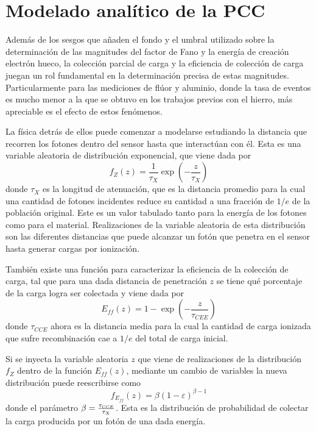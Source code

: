 \chapter{Modelado analítico de la PCC \label{chap:ModeloPCC}}
\noindent Además de los sesgos que añaden el fondo y el umbral utilizado sobre la determinación de las magnitudes del factor de Fano y la energía de creación electrón hueco, la colección parcial de carga y la eficiencia de colección de carga juegan un rol fundamental en la determinación precisa de estas magnitudes. Particularmente para las mediciones de flúor y aluminio, donde la tasa de eventos es mucho menor a la que se obtuvo en los trabajos previos\cite{TesisAndi,TesisKevin,Rodrigues} con el hierro, más apreciable es el efecto de estos fenómenos.

La física detrás de ellos puede comenzar a modelarse estudiando la distancia que recorren los fotones dentro del sensor hasta que interactúan con él. Esta es una variable aleatoria de distribución exponencial, que viene dada por
\begin{equation*}
    f_{Z}(z) = \frac{1}{\tau_{X}}\exp(-\frac{z}{\tau_{X}})
\end{equation*}
donde $\tau_{X}$ es la longitud de atenuación, que es la distancia promedio para la cual una cantidad de fotones incidentes reduce su cantidad a una fracción de $1/e$ de la población original. Este es un valor tabulado tanto para la energía de los fotones como para el material. Realizaciones de la variable aleatoria de esta distribución son las diferentes distancias que puede alcanzar un fotón que penetra en el sensor hasta generar cargas por ionización.

También existe una función para caracterizar la eficiencia de la colección de carga, tal que para una dada distancia de penetración $z$ se tiene qué porcentaje de la carga logra ser colectada y viene dada por
\begin{equation*}
    E_{ff}(z) = 1 - 
    \exp
    \left(
        -\frac{z}{\tau_{CEE}}
    \right)
\end{equation*}
donde $\tau_{CCE}$ ahora es la distancia media para la cual la cantidad de carga ionizada que sufre recombinación cae a $1/e$ del total de carga inicial.

Si se inyecta la variable aleatoria $z$ que viene de realizaciones de la distribución $f_{Z}$ dentro de la función $E_{ff}(z)$, mediante un cambio de variables la nueva distribución puede reescribirse como
\begin{equation*}
    f_{E_{ff}}(z) = \beta (1 - \varepsilon)^{\beta - 1}
\end{equation*}
donde el parámetro $\beta = \frac{\tau_{\scaleto{CCE}{3pt}}}{\tau_{X}}$. Esta es la distribución de probabilidad de colectar la carga producida por un fotón de una dada energía.

